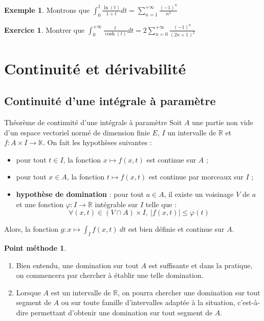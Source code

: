 \documentclass[french]{article}
\newcommand{\R}{\mathbb{R}}
\newcommand{\K}{\mathbb{K}}
\theoremstyle{plain}
\theoremstyle{definition}
\newtheorem*{ex}{Exemple}
\newtheorem*{met}{Point méthode}
\newtheorem{exo}{Exercice}
\theoremstyle{remark}
\begin{document}
\begin{ex}
	Montrons que $\displaystyle\int_{0}^{1}\frac{\ln(t)}{1+t}dt=\sum_{n=1}^{+\infty}\frac{(-1)^n}{n^2}$
\end{ex}

\begin{exo}
	Montrer que $\displaystyle\int_{0}^{+\infty}\frac{t}{\cosh(t)}dt=2\sum_{n=0}^{+\infty}\frac{(-1)^n}{(2n+1)^2}$
\end{exo}

\section{Continuité et dérivabilité}

\subsection{Continuité d'une intégrale à paramètre}

\begin{thm}{Théorème de continuité d'une intégrale à paramètre}
	Soit $A$ une partie non vide d'un espace vectoriel normé de dimension finie $E$, $I$ un intervalle de $\R$ et $f:A\times I\to\K$. On fait les hypothèses suivantes :
	\begin{itemize}
		\item pour tout $t\in I$, la fonction $x\mapsto f(x,t)$ est continue sur $A$ ;
		\item pour tout $x\in A$, la fonction $t\mapsto f(x,t)$ est continue par morceaux sur $I$ ;
		\item \textbf{hypothèse de domination} : pour tout $a\in A$, il existe un voisinage $V$ de $a$ et une fonction $\varphi:I\to\R$ intégrable sur $I$ telle que : $$\forall (x,t)\in (V\cap A)\times I,\ \lvert f(x,t)\rvert\leqslant\varphi(t)$$
	\end{itemize} Alors, la fonction $g:x\mapsto\displaystyle\int_I f(x,t)\ dt$ est bien définie et continue sur $A$.
\end{thm}

\begin{met}
	\begin{enumerate}
		\item Bien entendu, une domination sur tout $A$ est suffisante et dans la pratique, on commencera par chercher à établir une telle domination.
		\item Lorsque $A$ est un intervalle de $\R$, on pourra chercher une domination sur tout segment de $A$ ou sur toute famille d'intervalles adaptée à la situation, c'est-à-dire permettant d'obtenir une domination sur tout segment de $A$.
	\end{enumerate}
\end{met}
\end{document}
